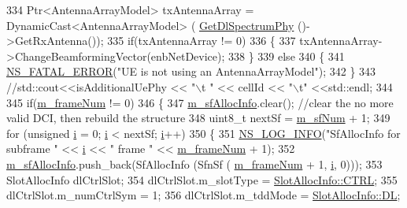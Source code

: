 \begin{DoxyCode}
334         Ptr<AntennaArrayModel> txAntennaArray = DynamicCast<AntennaArrayModel> (
      \hyperlink{classns3_1_1MmWaveUePhy_ae2a7d8583554822543d5b62a02e7c8db}{GetDlSpectrumPhy} ()->GetRxAntenna());
335         \textcolor{keywordflow}{if}(txAntennaArray != 0)
336         \{
337                 txAntennaArray->ChangeBeamformingVector(enbNetDevice);
338         \}
339         \textcolor{keywordflow}{else}
340         \{
341                 \hyperlink{group__fatal_ga5131d5e3f75d7d4cbfd706ac456fdc85}{NS\_FATAL\_ERROR}(\textcolor{stringliteral}{"UE is not using an AntennaArrayModel"});
342         \}       
343         \textcolor{comment}{//std::cout<<isAdditionalUePhy << "\(\backslash\)t " << cellId << "\(\backslash\)t" <<std::endl;}
344 
345         \textcolor{keywordflow}{if}(\hyperlink{classns3_1_1MmWavePhy_a852ce585035a1c12122d2775e64ff38a}{m\_frameNum} != 0)
346         \{
347                 \hyperlink{classns3_1_1MmWavePhy_a6e7002b99b8c50976033e0b96523f08c}{m\_sfAllocInfo}.clear(); \textcolor{comment}{//clear the no more valid DCI, then rebuild the
       structure}
348                 uint8\_t nextSf = \hyperlink{classns3_1_1MmWavePhy_af3d76eb9f3e5e1ff669852d05986c1a3}{m\_sfNum} + 1;
349                 \textcolor{keywordflow}{for} (\textcolor{keywordtype}{unsigned} \hyperlink{bernuolliDistribution_8m_a6f6ccfcf58b31cb6412107d9d5281426}{i} = 0; \hyperlink{bernuolliDistribution_8m_a6f6ccfcf58b31cb6412107d9d5281426}{i} < nextSf; \hyperlink{bernuolliDistribution_8m_a6f6ccfcf58b31cb6412107d9d5281426}{i}++)
350                 \{
351                         \hyperlink{group__logging_gafbd73ee2cf9f26b319f49086d8e860fb}{NS\_LOG\_INFO}(\textcolor{stringliteral}{"SfAllocInfo for subframe "} << \hyperlink{bernuolliDistribution_8m_a6f6ccfcf58b31cb6412107d9d5281426}{i} << \textcolor{stringliteral}{" frame "} << 
      \hyperlink{classns3_1_1MmWavePhy_a852ce585035a1c12122d2775e64ff38a}{m\_frameNum} + 1);
352                         \hyperlink{classns3_1_1MmWavePhy_a6e7002b99b8c50976033e0b96523f08c}{m\_sfAllocInfo}.push\_back(SfAllocInfo (SfnSf (
      \hyperlink{classns3_1_1MmWavePhy_a852ce585035a1c12122d2775e64ff38a}{m\_frameNum} + 1, \hyperlink{bernuolliDistribution_8m_a6f6ccfcf58b31cb6412107d9d5281426}{i}, 0)));
353                         SlotAllocInfo dlCtrlSlot;
354                         dlCtrlSlot.m\_slotType = \hyperlink{structns3_1_1SlotAllocInfo_a3ea7cb503bfd0c9a4df55a71b81b9331ad78b7d76ef82d56c33be1fa9c1867409}{SlotAllocInfo::CTRL};
355                         dlCtrlSlot.m\_numCtrlSym = 1;
356                         dlCtrlSlot.m\_tddMode = \hyperlink{structns3_1_1SlotAllocInfo_a6cad60db1d39034f1851e2cea625fe5da9a365c9c56b7c32dcae38ee1a468ce6d}{SlotAllocInfo::DL};

\end{DoxyCode}
